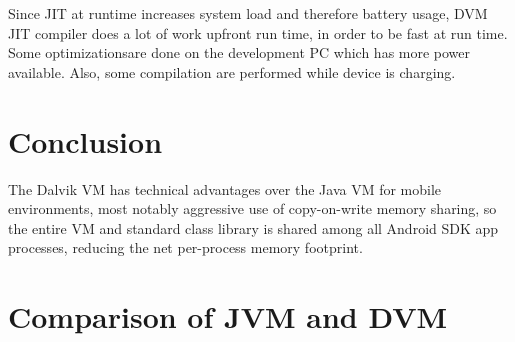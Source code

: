 \documentclass[11pt, oneside]{article}   	%
\begin{document}
Since JIT at runtime increases system load and therefore battery usage, DVM JIT compiler does a lot of work upfront run time, in order to be fast at run time. Some optimizationsare done on the development PC which has more power available. Also, some compilation are performed while device is charging.


\section{Conclusion}

The Dalvik VM has technical advantages over the Java VM for mobile environments, most notably aggressive use of copy-on-write memory sharing, so the entire VM and standard class library is shared among all Android SDK app processes, reducing the net per-process memory footprint.

\appendix
\section{Comparison of JVM and DVM}
\end{document}
